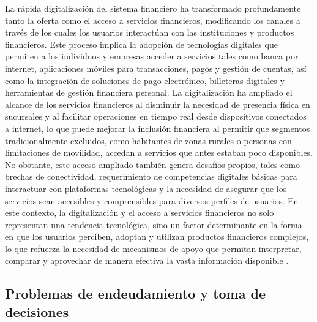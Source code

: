 \documentclass[
	spanish, %
	letterpaper, oneside
]{book}
\begin{document}
La rápida digitalización del sistema financiero ha transformado profundamente tanto la oferta como el acceso a servicios financieros, modificando los canales a través de los cuales los usuarios interactúan con las instituciones y productos financieros. Este proceso implica la adopción de tecnologías digitales que permiten a los individuos y empresas acceder a servicios tales como banca por internet, aplicaciones móviles para transacciones, pagos y gestión de cuentas, así como la integración de soluciones de pago electrónico, billeteras digitales y herramientas de gestión financiera personal. La digitalización ha ampliado el alcance de los servicios financieros al disminuir la necesidad de presencia física en sucursales y al facilitar operaciones en tiempo real desde dispositivos conectados a internet, lo que puede mejorar la inclusión financiera al permitir que segmentos tradicionalmente excluidos, como habitantes de zonas rurales o personas con limitaciones de movilidad, accedan a servicios que antes estaban poco disponibles. No obstante, este acceso ampliado también genera desafíos propios, tales como brechas de conectividad, requerimiento de competencias digitales básicas para interactuar con plataformas tecnológicas y la necesidad de asegurar que los servicios sean accesibles y comprensibles para diversos perfiles de usuarios. En este contexto, la digitalización y el acceso a servicios financieros no solo representan una tendencia tecnológica, sino un factor determinante en la forma en que los usuarios perciben, adoptan y utilizan productos financieros complejos, lo que refuerza la necesidad de mecanismos de apoyo que permitan interpretar, comparar y aprovechar de manera efectiva la vasta información disponible \cite{turn0search0}.



\subsection{Problemas de endeudamiento y toma de decisiones}
\end{document}
